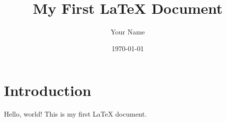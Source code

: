 \documentclass{article}
\title{My First LaTeX Document}
\author{Your Name}
\date{\today}
\begin{document}
\maketitle

\section{Introduction}

Hello, world! This is my first LaTeX document.
\end{document}

